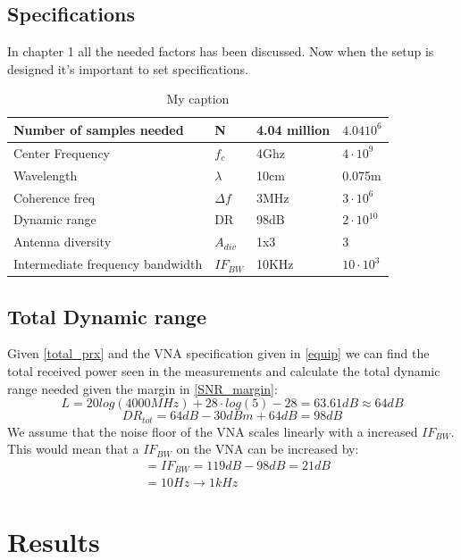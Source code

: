 \subsection{Specifications}
In chapter 1 all the needed factors has been discussed. Now when the setup is designed it's important to set specifications.
\begin{table}[]
\centering
\caption{My caption}
\label{final_specs}
\begin{tabular}{|l|l|l|l|}
\hline
Number of samples needed         & N           & 4.04 million   & $4.04 10^6$        \\ \hline
Center Frequency                 & $f_c$       & 4Ghz           & $4 \cdot 10^9$     \\ \hline
Wavelength                       & $\lambda$   & 10cm           & 0.075m               \\ \hline
Coherence freq                   & $\Delta f$  & 3MHz           & $3 \cdot 10^6$     \\ \hline
Dynamic range                    & DR          & 98dB           & $2\cdot 10^10$             \\ \hline
Antenna diversity                & $A_{div}$   & 1x3            & 3                  \\ \hline
Intermediate frequency bandwidth & $IF_{BW}$     & 10KHz          & $10 \cdot 10^3$ \\ \hline
\end{tabular}
\end{table}
\subsection{Total Dynamic range}
Given \autoref{total_prx} and the VNA specification given in \autoref{equip} we can find the total received power seen in the measurements and calculate the total dynamic range needed given the margin in \autoref{SNR_margin}:
\begin{equation}
L = 20log (4000MHz) + 28 \cdot log(5)-28 = 63.61dB \approx 64dB
\end{equation}
\begin{equation}
DR_{tot} = 64dB - 30dBm + 64dB = 98dB 
\end{equation}
We assume that the noise floor of the \gls{VNA} scales linearly with a increased $IF_{BW}$. This would mean that a $IF_{BW}$ on the \gls{VNA} can be increased by:
\begin{equation}
\begin{split}
&= IF_{BW} = 119dB-98dB = 21dB \\
           &= 10Hz \rightarrow 1kHz
\end{split}
\end{equation}
\section{Results}